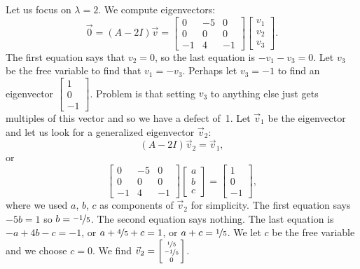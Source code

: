 \begin{example}
Let us focus on $\lambda = 2$.  We compute eigenvectors:
\begin{equation*}
\vec{0} =
(A - 2 I) \vec{v}
=
\begin{bmatrix}
0 & -5 & 0 \\
0 & 0 & 0 \\
-1 & 4 & -1
\end{bmatrix}
\begin{bmatrix}
v_1 \\ v_2 \\ v_3
\end{bmatrix}
.
\end{equation*}
The first equation says that $v_2 = 0$, so the last equation
is $-v_1 -v_3 = 0$.  Let $v_3$ be the free variable to find
that $v_1 = -v_3$.  Perhaps let $v_3 = -1$ to find an eigenvector
$\left[ \begin{smallmatrix} 1 \\ 0 \\ -1 \end{smallmatrix} \right]$.
Problem is that setting $v_3$ to anything else just gets multiples
of this vector and so we have a defect of~1.
Let $\vec{v}_1$ be the eigenvector and let us look for
a generalized eigenvector $\vec{v}_2$:
\begin{equation*}
(A - 2 I) \vec{v}_2 = \vec{v}_1 , 
\end{equation*}
or
\begin{equation*}
\begin{bmatrix}
0 & -5 & 0 \\
0 & 0 & 0 \\
-1 & 4 & -1
\end{bmatrix}
\begin{bmatrix}
a \\ b \\ c
\end{bmatrix}
=
\begin{bmatrix}
1 \\ 0 \\ -1
\end{bmatrix} ,
\end{equation*}
where we used $a$, $b$, $c$ as components of $\vec{v}_2$ for simplicity.
The first equation says $-5b = 1$ so $b = \nicefrac{-1}{5}$.  The
second equation says nothing.
The last equation is $-a + 4b - c = -1$, or
$a + \nicefrac{4}{5} + c = 1$, or
$a + c = \nicefrac{1}{5}$.  We let $c$ be the free variable and we
choose $c=0$.  We find
$\vec{v}_2 = \left[ \begin{smallmatrix} \nicefrac{1}{5} \\ \nicefrac{-1}{5}
\\ 0 \end{smallmatrix} \right]$.


\end{example}
